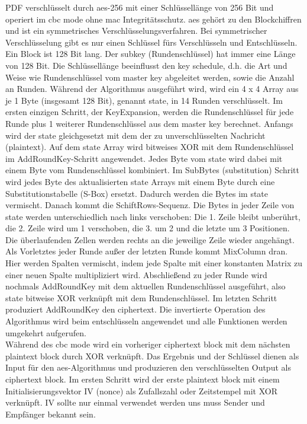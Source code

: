 PDF verschlüsselt durch \gls{aes}-256 mit einer Schlüssellänge von 256 Bit und operiert im \gls{cbc} mode ohne \gls{mac} Integritätsschutz. \gls{aes} gehört zu den Blockchiffren und ist ein symmetrisches Verschlüsselungsverfahren. Bei symmetrischer Verschlüsselung gibt es nur einen Schlüssel fürs Verschlüsseln und Entschlüsseln. Ein Block ist 128 Bit lang. Der subkey (Rundenschlüssel) hat immer eine Länge von 128 Bit. Die Schlüssellänge beeinflusst den key schedule, d.h. die Art und Weise wie Rundenschlüssel vom master key abgeleitet werden, sowie die Anzahl an Runden. Während der Algorithmus ausgeführt wird, wird ein 4 x 4 Array aus je 1 Byte (insgesamt 128 Bit), genannt state, in 14 Runden verschlüsselt. Im ersten einzigen Schritt, der KeyExpansion, werden die Rundenschlüssel für jede Runde plus 1 weiterer Rundenschlüssel aus dem master key berechnet. Anfangs wird der state gleichgesetzt mit dem der zu unverschlüsselten Nachricht (plaintext). Auf dem state Array wird bitweises XOR mit dem Rundenschlüssel im AddRoundKey-Schritt angewendet. Jedes Byte vom state wird dabei mit einem Byte vom Rundenschlüssel kombiniert. Im SubBytes (substitution) Schritt wird jedes Byte des aktualisierten state Arrays mit einem Byte durch eine Substitutionstabelle (S-Box) ersetzt. Dadurch werden die Bytes im state vermischt. Danach kommt die SchiftRows-Sequenz. Die Bytes in jeder Zeile von state werden unterschiedlich nach links verschoben: Die 1. Zeile bleibt unberührt, die 2. Zeile wird um 1 verschoben, die 3. um 2 und die letzte um 3 Positionen. Die überlaufenden Zellen werden rechts an die jeweilige Zeile wieder angehängt. Als Vorletztes jeder Runde außer der letzten Runde kommt MixColumn dran. Hier werden Spalten vermischt, indem jede Spalte mit einer konstanten Matrix zu einer neuen Spalte multipliziert wird. Abschließend zu jeder Runde wird nochmals AddRoundKey mit dem aktuellen Rundenschlüssel ausgeführt, also state bitweise XOR verknüpft mit dem Rundenschlüssel. Im letzten Schritt produziert AddRoundKey den ciphertext. Die invertierte Operation des Algorithmus wird beim entschlüsseln angewendet und alle Funktionen werden umgekehrt aufgerufen. \cite{intro-crypto, studyflix-aes, simply-aes} \\
Während des \gls{cbc} mode wird ein vorheriger ciphertext block mit dem nächsten plaintext block durch XOR verknüpft. Das Ergebnis und der Schlüssel dienen als Input für den \gls{aes}-Algorithmus und produzieren den verschlüsselten Output als ciphertext block. Im ersten Schritt wird der erste plaintext block mit einem Initialisierungsvektor IV (nonce) als Zufallszahl oder Zeitstempel mit XOR verknüpft. IV sollte nur einmal verwendet werden uns muss Sender und Empfänger bekannt sein. \cite{crypto-web} \\
